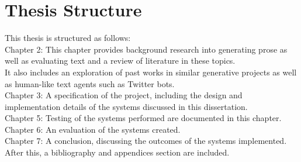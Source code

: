 \section{Thesis Structure}
This thesis is structured as follows:\\
Chapter 2: This chapter provides background research into generating prose as well as evaluating text and a review of literature in these topics.\\ It also includes an exploration of past works in similar generative projects as well as human-like text agents such as Twitter bots.\\
Chapter 3: A specification of the project, including the design and implementation details of the systems discussed in this dissertation.\\
Chapter 5: Testing of the systems performed are documented in this chapter.\\
Chapter 6: An evaluation of the systems created.\\
Chapter 7: A conclusion, discussing the outcomes of the systems implemented.\\
After this, a bibliography and appendices section are included.